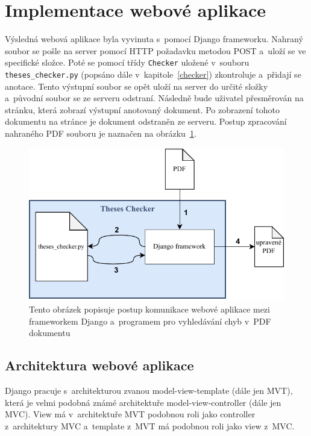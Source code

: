 \section{Implementace webové aplikace} \label{web_app}
Výsledná webová aplikace byla vyvinuta s~pomocí Django frameworku.
Nahraný soubor se pošle na server pomocí HTTP požadavku metodou POST
a~uloží se ve specifické složce. Poté se pomocí třídy \texttt{Checker}
uložené v~souboru \texttt{theses\_checker.py} (popsáno dále
v~kapitole~\ref{checker}) zkontroluje a~přidají se anotace.
Tento výstupní soubor se opět uloží na server do určité složky a~původní soubor
se ze serveru odstraní. Následně bude uživatel přesměrován na stránku, která
zobrazí výstupní anotovaný dokument. Po zobrazení tohoto dokumentu na stránce je
dokument odstraněn ze serveru. Postup zpracování nahraného PDF souboru je
naznačen na obrázku~\ref{pic_communication}.

\begin{figure}[H]
    \centering
    \includegraphics[width=0.8\linewidth]{obrazky-figures/Theses_Checker_communication.pdf}
    \caption{
        Tento obrázek popisuje postup komunikace webové aplikace mezi 
        frameworkem Django a~programem pro vyhledávání chyb v~PDF dokumentu 
    }
    \label{pic_communication}
\end{figure}


\subsection*{Architektura webové aplikace}
Django pracuje s~architekturou zvanou model-view-template (dále jen MVT),
která je velmi podobná známé architektuře model-view-controller (dále jen MVC).
View má v~architektuře MVT podobnou roli jako controller z~architektury MVC 
a~template z~MVT má podobnou roli jako view z~MVC.

